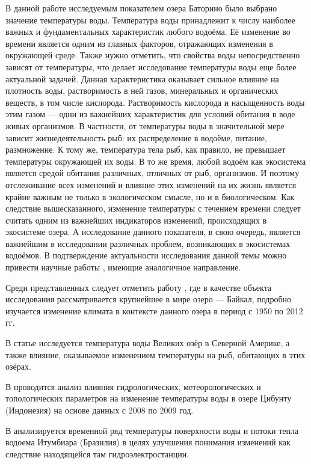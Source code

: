 В данной работе исследуемым показателем озера Баторино было выбрано значение температуры воды. Температура воды принадлежит к числу наиболее важных и фундаментальных характеристик любого водоёма. Её изменение во времени является одним из главных факторов, отражающих изменения в окружающей среде. Также нужно отметить, что свойства воды непосредственно зависят от температуры, что делает исследование температуры воды еще более актуальной задачей. Данная характеристика оказывает сильное влияние на плотность воды, растворимость в ней газов, минеральных и органических веществ, в том числе кислорода. Растворимость кислорода и насыщенность воды этим газом --- одни из важнейших характеристик для условий обитания в воде живых организмов. В частности, от температуры воды в значительной мере зависит жизнедеятельность рыб: их распределение в водоёме, питание, размножение. К тому же, температура тела рыб, как правило, не превышает температуры окружающей их воды. В то же время, любой водоём как экосистема является средой обитания различных, отличных от рыб, организмов. И поэтому отслеживание всех изменений и влияние этих изменений на их жизнь является крайне важным не только в экологическом смысле, но и в биологическом. Как следствие вышесказанного, изменение температуры с течением времени следует считать одним из важнейших индикаторов изменений, происходящих в экосистеме озера. А исследование данного показателя, в свою очередь, является важнейшим в исследовании различных проблем, возникающих в экосистемах водоёмов. В подтверждение актуальности исследования данной темы можно привести научные работы \cite{Katz2011,OBrien2012a,Subehi2011, ALCANTARA2011, Chokshi2006}, имеющие аналогичное направление.

Среди представленных следует отметить работу \cite{Katz2011}, где в качестве объекта исследования рассматривается крупнейшее в мире озеро --- Байкал, подробно изучается изменение климата в контексте данного озера в период с 1950 по 2012 гг.

В статье \cite{OBrien2012a} исследуется температура воды Великих озёр в Северной Америке, а также влияние, оказываемое изменением температуры на рыб, обитающих в этих озёрах.

В \cite{Subehi2011} проводится анализ влияния гидрологических, метеорологических и топологических параметров на изменение температуры воды в озере Цибунту (Индонезия) на основе данных с 2008 по 2009 год.

В \cite{ALCANTARA2011} анализируется временной ряд температуры поверхности воды и потоки тепла водоема Итумбиара (Бразилия) в целях улучшения понимания изменений как следствие находящейся там гидроэлектростанции.

